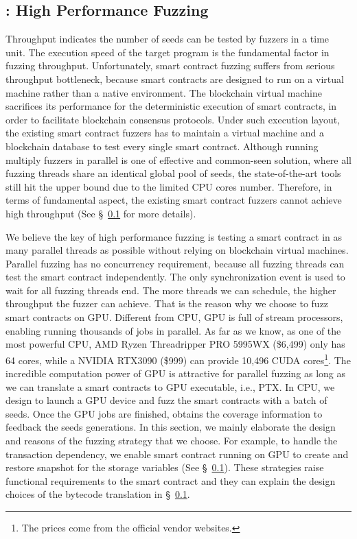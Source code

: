 \subsection{{\runner}: High Performance Fuzzing}
Throughput indicates the number of seeds can be tested by fuzzers in a time unit. The execution speed of the target program is the fundamental factor in fuzzing throughput\cite{fuzzan_atc}. 
Unfortunately, smart contract fuzzing suffers from serious throughput bottleneck, because smart contracts are designed to run on a virtual machine rather than a native environment. 
The blockchain virtual machine sacrifices its performance for the deterministic execution of smart contracts, in order to facilitate blockchain consensus protocols.
%
Under such execution layout, the existing smart contract fuzzers has to maintain a virtual machine and a blockchain database to test every single smart contract. 
%
Although running multiply fuzzers in parallel is one of effective and common-seen solution\cite{confuzzius_eurosp,echidna_issta ,afl,angora_sp,enfuzz_sec}, where all fuzzing threads share an identical global pool of seeds, the state-of-the-art tools still hit the upper bound due to the limited CPU cores number.
%
Therefore, in terms of fundamental aspect, the existing smart contract fuzzers cannot achieve high throughput (See \S~\ref{} for more details).
%

We believe the key of high performance fuzzing is testing a smart contract in as many parallel threads as possible without relying on blockchain virtual machines. 
%
Parallel fuzzing has no concurrency requirement, because all fuzzing threads can test the smart contract independently. The only synchronization event is used to wait for all fuzzing threads end. The more threads we can schedule, the higher throughput the fuzzer can achieve.
That is the reason why we choose to fuzz smart contracts on GPU. 
Different from CPU, GPU is full of stream processors, enabling running thousands of jobs in parallel. 
As far as we know, as one of the most powerful CPU, AMD Ryzen Threadripper PRO 5995WX (\$6,499) only has 64 cores, while a NVIDIA RTX3090 (\$999) can provide 10,496 CUDA cores\footnote{The prices come from the official vendor websites.}. 
The incredible computation power of GPU is attractive for parallel fuzzing as long as we can translate a smart contracts to GPU executable, i.e., PTX\cite{}. 
%
In CPU, we design {\runner} to launch a GPU device and fuzz the smart contracts with a batch of seeds. Once the GPU jobs are finished, {\runner} obtains the coverage information to feedback the seeds generations. 
%
In this section, we mainly elaborate the design and reasons of the fuzzing strategy that we choose. 
For example, to handle the transaction dependency, we enable smart contract running on GPU to create and restore snapshot for the storage variables (See \S~\ref{}). 
These strategies raise functional requirements to the smart contract and they can explain the design choices of the bytecode translation in \S~\ref{}.

